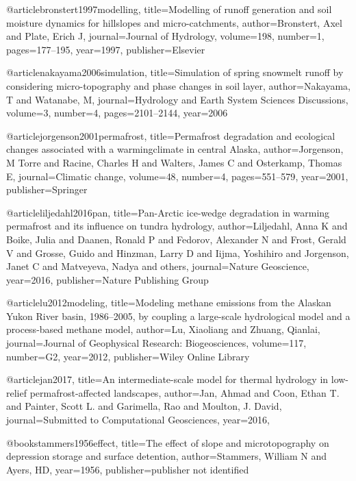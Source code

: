 \begin{thebibliography}{}
@article{bronstert1997modelling,
  title={Modelling of runoff generation and soil moisture dynamics for hillslopes and micro-catchments},
  author={Bronstert, Axel and Plate, Erich J},
  journal={Journal of Hydrology},
  volume={198},
  number={1},
  pages={177--195},
  year={1997},
  publisher={Elsevier}
}

@article{nakayama2006simulation,
  title={Simulation of spring snowmelt runoff by considering micro-topography and phase changes in soil layer},
  author={Nakayama, T and Watanabe, M},
  journal={Hydrology and Earth System Sciences Discussions},
  volume={3},
  number={4},
  pages={2101--2144},
  year={2006}
}

@article{jorgenson2001permafrost,
  title={Permafrost degradation and ecological changes associated with a warmingclimate in central Alaska},
  author={Jorgenson, M Torre and Racine, Charles H and Walters, James C and Osterkamp, Thomas E},
  journal={Climatic change},
  volume={48},
  number={4},
  pages={551--579},
  year={2001},
  publisher={Springer}
}

@article{liljedahl2016pan,
  title={Pan-Arctic ice-wedge degradation in warming permafrost and its influence on tundra hydrology},
  author={Liljedahl, Anna K and Boike, Julia and Daanen, Ronald P and Fedorov, Alexander N and Frost, Gerald V and Grosse, Guido and Hinzman, Larry D and Iijma, Yoshihiro and Jorgenson, Janet C and Matveyeva, Nadya and others},
  journal={Nature Geoscience},
  year={2016},
  publisher={Nature Publishing Group}
}

@article{lu2012modeling,
  title={Modeling methane emissions from the Alaskan Yukon River basin, 1986--2005, by coupling a large-scale hydrological model and a process-based methane model},
  author={Lu, Xiaoliang and Zhuang, Qianlai},
  journal={Journal of Geophysical Research: Biogeosciences},
  volume={117},
  number={G2},
  year={2012},
  publisher={Wiley Online Library}
}

@article{jan2017,
 title={An intermediate-scale model for thermal hydrology in low-relief permafrost-affected landscapes},
  author={Jan, Ahmad and Coon, Ethan T. and Painter, Scott L. and Garimella, Rao and Moulton, J. David},
  journal={Submitted to Computational Geosciences},
  year={2016},
}

@book{stammers1956effect,
  title={The effect of slope and microtopography on depression storage and surface detention},
  author={Stammers, William N and Ayers, HD},
  year={1956},
  publisher={publisher not identified}
}


\end{thebibliography}
